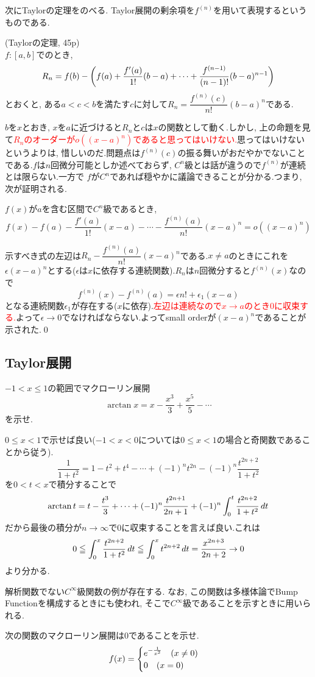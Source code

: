 次にTaylorの定理をのべる. Taylor展開の剰余項を$f^{(n)}$を用いて表現するというものである.

\begin{prop} (Taylorの定理, \cite{rikou}45p)\\
$f:[a,b]$でのとき,
\[R_n = f(b) - \left( f(a) + \dfrac{f'(a)}{1!}(b-a) + \cdots + \dfrac{f^{(n-1)}}{(n-1)!}(b-a)^{n-1} \right)\]
とおくと, ある$a<c<b$を満たす$c$に対して$R_n = \dfrac{f^{(n)}(c)}{n!}(b-a)^{n}$である.
\end{prop}
$b$を$x$とおき, $x$を$a$に近づけると$R_n$と$c$は$x$の関数として動く.しかし,  上の命題を見て\textcolor{red}{$R_n$のオーダーが$o((x-a)^{n})$であると思ってはいけない.}思ってはいけないというよりは, 惜しいのだ.問題点は$f^{(n)}(c)$の振る舞いがおだやかでないことである.$f$は$n$回微分可能としか述べておらず, $C^{n}$級とは話が違うので$f^{(n)}$が連続とは限らない.一方で $f$が$C^{n}$であれば穏やかに議論できることが分かる.つまり, 次が証明される.
\begin{prop}
$f(x)$が$a$を含む区間で$C^{n}$級であるとき,
\[f(x) - f(a) - \dfrac{f'(a)}{1!}(x-a) - \cdots - \dfrac{f^{(n)}(a)}{n!}(x-a)^{n} = o((x-a)^{n})\]
\end{prop}
\prf
示すべき式の左辺は$R_n - \dfrac{f^{(n)}(a)}{n!}(x-a)^{n}$である.$x\neq a$のときにこれを$\epsilon(x-a)^{n}$とする($\epsilon$は$x$に依存する連続関数).$R_{n}$は$n$回微分すると$f^{(n)}(x)$なので
\[f^{(n)}(x) - f^{(n)}(a) = \epsilon n! + \epsilon_1 (x-a)\]
となる連続関数$\epsilon_1$が存在する($x$に依存).\textcolor{red}{左辺は連続なので$x\to a$のとき$0$に収束する.}よって$\epsilon \to 0$でなければならない.よってsmall orderが$(x-a)^{n}$であることが示された.\qed
\newpage
\subsection{Taylor展開}

\begin{egprob}
$-1<x\leq 1$の範囲でマクローリン展開
\[\arctan{x} = x-\dfrac{x^3}{3} + \dfrac{x^5}{5} - \cdots \]
を示せ.
\end{egprob}
\begin{egans}
$0\leq x<1$で示せば良い($-1<x<0$については$0\leq x<1$の場合と奇関数であることから従う).
\[\dfrac{1}{1+t^2} = 1-t^2 + t^4 - \cdots + (-1)^{n} t^{2n} - (-1)^{n} \dfrac{t^{2n+2}}{1+t^2}\]
を$0<t<x$で積分することで
\[\arctan{t} = t-\dfrac{t^3}{3} + \cdots + (-1)^{n}\dfrac{t^{2n+1}}{2n+1} + (-1)^{n} \displaystyle\int_{0}^{t} \dfrac{t^{2n+2}}{1+t^2}\, dt\]
だから最後の積分が$n\to \infty$で$0$に収束することを言えば良い.これは
\[0\leqq \displaystyle\int_{0}^{x} \dfrac{t^{2n+2}}{1+t^2} \, dt \leqq \displaystyle\int_{0}^{x} t^{2n+2}\, dt = \dfrac{x^{2n+3}}{2n+2} \to 0 \]
より分かる.
\end{egans}
解析関数でない$C^{\infty}$級関数の例が存在する. なお, この関数は多様体論でBump Functionを構成するときにも使われ, そこで$C^{\infty}$級であることを示すときに用いられる.
\begin{egprob}
次の関数のマクローリン展開は$0$であることを示せ.
\[
f(x) = \begin{cases} e^{-\frac{1}{x^2}}\quad (x\neq 0)\\ 0 \quad (x=0) \end{cases}
\]
\end{egprob}


